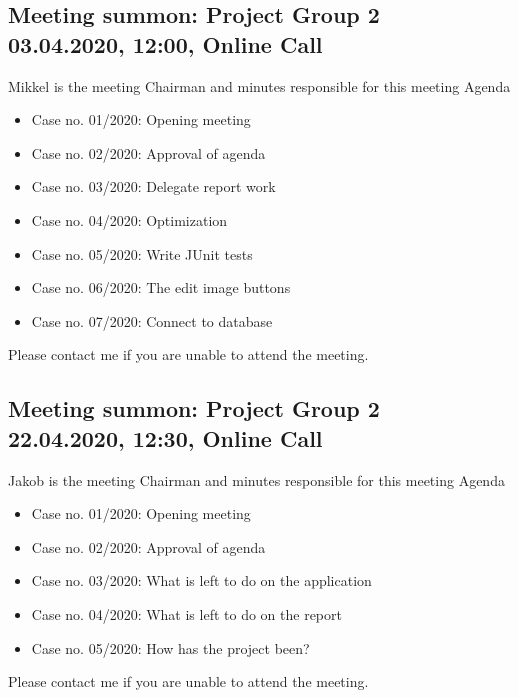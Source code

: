 \documentclass{article}
\begin{document}
\subsection[Meeting summon: Project Group 2]{Meeting summon: Project Group 2\\ {\large 03.04.2020, 12:00, Online Call}}

Mikkel is the meeting Chairman and minutes responsible for this meeting
\newline
\newline
\large Agenda
\begin{itemize}
    \item Case no. 01/2020:  Opening meeting
    \item Case no. 02/2020:  Approval of agenda
    \item Case no. 03/2020:  Delegate report work
    \item Case no. 04/2020:  Optimization
    \item Case no. 05/2020:  Write JUnit tests
    \item Case no. 06/2020:  The edit image buttons
    \item Case no. 07/2020:  Connect to database
\end{itemize}
\newline
\newline
Please contact me if you are unable to attend the meeting.
\newpage

\subsection[Meeting summon: Project Group 2]{Meeting summon: Project Group 2\\ {\large 22.04.2020, 12:30, Online Call}}

Jakob is the meeting Chairman and minutes responsible for this meeting
\newline
\newline
\large Agenda
\begin{itemize}
    \item Case no. 01/2020:  Opening meeting
    \item Case no. 02/2020:  Approval of agenda
    \item Case no. 03/2020:  What is left to do on the application
    \item Case no. 04/2020:  What is left to do on the report
    \item Case no. 05/2020:  How has the project been?
\end{itemize}
\newline
\newline
Please contact me if you are unable to attend the meeting.
\end{document}
